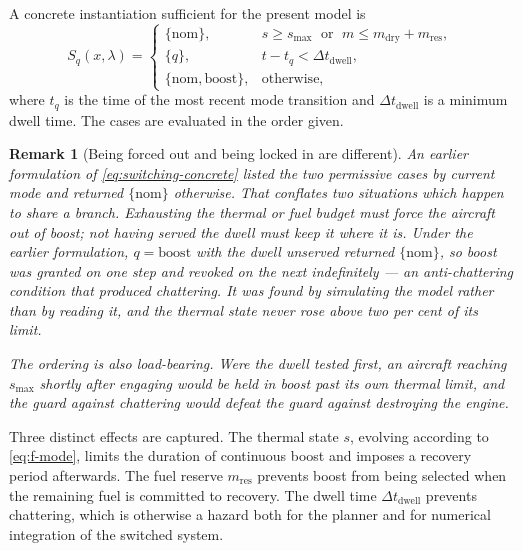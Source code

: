 \documentclass[11pt,a4paper]{article}
\newtheorem{remark}{Remark}
\newcommand{\Sset}{S}
\newcommand{\vecx}{x}
\newcommand{\veclambda}{\lambda}
\begin{document}
A concrete instantiation sufficient for the present model is
\begin{equation}
  \Sset_{q}(\vecx, \veclambda) =
  \begin{cases}
    \{\mathrm{nom}\},
      & s \ge s_{\max}
        \;\text{ or }\;
        m \le m_{\mathrm{dry}} + m_{\mathrm{res}}, \\[4pt]
    \{q\},
      & t - t_{q} < \Delta t_{\mathrm{dwell}}, \\[4pt]
    \{\mathrm{nom}, \mathrm{boost}\},
      & \text{otherwise,}
  \end{cases}
  \label{eq:switching-concrete}
\end{equation}
where $t_q$ is the time of the most recent mode transition and
$\Delta t_{\mathrm{dwell}}$ is a minimum dwell time. The cases are evaluated
in the order given.

\begin{remark}[Being forced out and being locked in are different]
An earlier formulation of \cref{eq:switching-concrete} listed the two
permissive cases by current mode and returned $\{\mathrm{nom}\}$ otherwise.
That conflates two situations which happen to share a branch. Exhausting the
thermal or fuel budget must force the aircraft \emph{out} of boost; not having
served the dwell must \emph{keep} it where it is. Under the earlier
formulation, $q = \mathrm{boost}$ with the dwell unserved returned
$\{\mathrm{nom}\}$, so boost was granted on one step and revoked on the next
indefinitely --- an anti-chattering condition that produced chattering. It was
found by simulating the model rather than by reading it, and the thermal state
never rose above two per cent of its limit.

The ordering is also load-bearing. Were the dwell tested first, an aircraft
reaching $s_{\max}$ shortly after engaging would be held in boost past its own
thermal limit, and the guard against chattering would defeat the guard against
destroying the engine.
\end{remark}

Three distinct effects are captured. The thermal state $s$, evolving according to
\cref{eq:f-mode}, limits the duration of continuous boost and imposes a recovery
period afterwards. The fuel reserve $m_{\mathrm{res}}$ prevents boost from being
selected when the remaining fuel is committed to recovery. The dwell time
$\Delta t_{\mathrm{dwell}}$ prevents chattering, which is otherwise a hazard both
for the planner and for numerical integration of the switched system.
\end{document}
